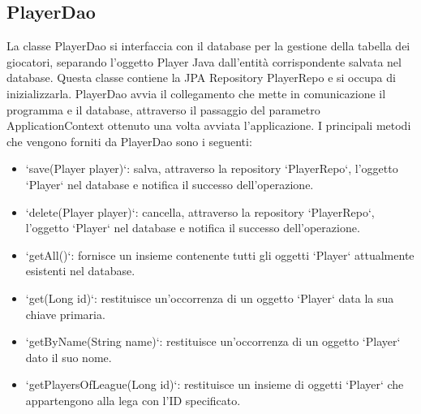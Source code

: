 \documentclass[twoside,openright,titlepage,fleqn,headinclude,12pt,a4paper,BCOR=5mm,footinclude]{scrbook}
\begin{document}
\subsection{PlayerDao} 
La classe PlayerDao si interfaccia con il database per la gestione della tabella dei giocatori, separando l'oggetto Player Java dall'entità corrispondente salvata nel database. Questa classe contiene la JPA Repository PlayerRepo e si occupa di inizializzarla. PlayerDao avvia il collegamento che mette in comunicazione il programma e il database, attraverso il passaggio del parametro ApplicationContext ottenuto una volta avviata l'applicazione. I principali metodi che vengono forniti da PlayerDao sono i seguenti:  
\begin{itemize}  
    \item `save(Player player)`: salva, attraverso la repository `PlayerRepo`, l'oggetto `Player` nel database e notifica il successo dell'operazione. 
    \item `delete(Player player)`: cancella, attraverso la repository `PlayerRepo`, l'oggetto `Player` nel database e notifica il successo dell'operazione. 
    \item `getAll()`: fornisce un insieme contenente tutti gli oggetti `Player` attualmente esistenti nel database. 
    \item `get(Long id)`: restituisce un'occorrenza di un oggetto `Player` data la sua chiave primaria. 
    \item `getByName(String name)`: restituisce un'occorrenza di un oggetto `Player` dato il suo nome. 
    \item `getPlayersOfLeague(Long id)`: restituisce un insieme di oggetti `Player` che appartengono alla lega con l'ID specificato.  
\end{itemize}
\end{document}
